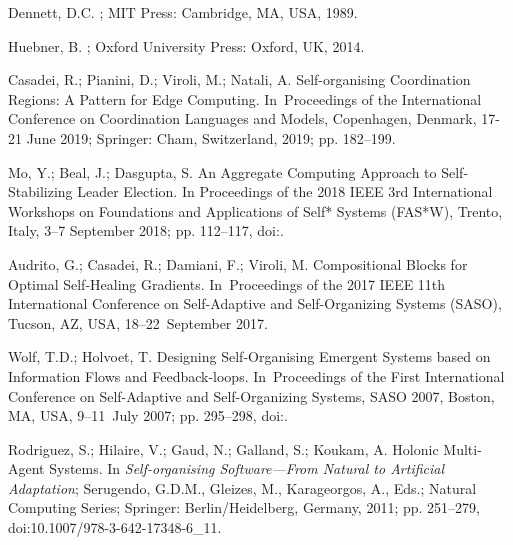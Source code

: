 \documentclass[jsan,article,accept,moreauthors,pdftex]{Definitions/mdpi}
\begin{document}
\begin{thebibliography}{999}
Dennett, D.C.
; MIT Press: Cambridge, MA, USA, %
  1989.

Huebner, B.
; Oxford University Press: Oxford, UK,  2014.

Casadei, R.; Pianini, D.; Viroli, M.; Natali, A.
\newblock Self-organising Coordination Regions: A Pattern for Edge Computing.
\newblock   In~Proceedings of the International Conference on Coordination Languages and Models, Copenhagen, Denmark, 17-21 June 2019; %
 Springer: Cham, Switzerland,  2019; pp. 182--199.

Mo, Y.; Beal, J.; Dasgupta, S.
\newblock An Aggregate Computing Approach to Self-Stabilizing Leader Election.
\newblock  In Proceedings of the  2018 {IEEE} 3rd International Workshops on Foundations and
  Applications of Self* Systems (FAS*W), Trento, Italy, 3--7 September 2018; pp. 112--117,
\newblock
  doi:{\href{https://doi.org/10.1109/FAS-W.2018.00034}{}}.

Audrito, G.; Casadei, R.; Damiani, F.; Viroli, M.
\newblock Compositional Blocks for Optimal Self-Healing Gradients.
\newblock  In~Proceedings of the 2017 IEEE 11th International Conference on Self-Adaptive and Self-Organizing Systems (SASO), Tucson, AZ, USA, \mbox{18--22 September} 2017.

Wolf, T.D.; Holvoet, T.
\newblock Designing Self-Organising Emergent Systems based on Information Flows
  and Feedback-loops.
\newblock  In~Proceedings of the First International Conference on Self-Adaptive
  and Self-Organizing Systems, {SASO} 2007, Boston, MA, USA, \mbox{9--11 July} 2007; pp. 295--298,
\newblock
  doi:{\href{https://doi.org/10.1109/SASO.2007.16}{}}.

Rodriguez, S.; Hilaire, V.; Gaud, N.; Galland, S.; Koukam, A.
\newblock Holonic Multi-Agent Systems. In {\em Self-organising Software---From
  Natural to Artificial Adaptation}; Serugendo, G.D.M., Gleizes, M.,
  Karageorgos, A., Eds.; Natural Computing Series; Springer:  Berlin/Heidelberg, Germany, %
  2011; pp.
  251--279,
\newblock
  doi:10.1007/978-3-642-17348-6\_11.


\end{thebibliography}
\end{document}
